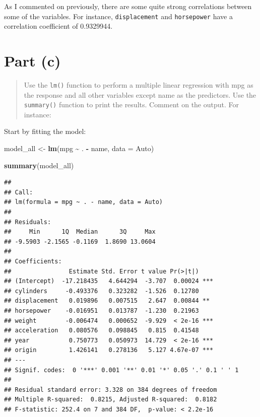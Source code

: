 \documentclass[
  11pt,
  a4paper]{article}
\newenvironment{Shaded}{\begin{snugshade}}{\end{snugshade}}
\newcommand{\AttributeTok}[1]{\textcolor[rgb]{0.13,0.29,0.53}{#1}}
\newcommand{\FunctionTok}[1]{\textcolor[rgb]{0.13,0.29,0.53}{\textbf{#1}}}
\newcommand{\NormalTok}[1]{#1}
\newcommand{\OtherTok}[1]{\textcolor[rgb]{0.56,0.35,0.01}{#1}}
\newcommand{\SpecialCharTok}[1]{\textcolor[rgb]{0.81,0.36,0.00}{\textbf{#1}}}
\begin{document}
As I commented on previously, there are some quite strong correlations between some of the variables. For instance, \texttt{displacement} and
\texttt{horsepower} have a correlation coefficient of 0.9329944.

\section{Part (c)}\label{part-c}

\begin{quote}
Use the \texttt{lm()} function to perform a multiple linear regression with mpg as the response and all other variables except name as the predictors. Use the \texttt{summary()} function to print the results. Comment on the output. For instance:
\end{quote}

Start by fitting the model:

\begin{Shaded}
\begin{Highlighting}[]
\NormalTok{model\_all }\OtherTok{\textless{}{-}} \FunctionTok{lm}\NormalTok{(mpg }\SpecialCharTok{\textasciitilde{}}\NormalTok{ . }\SpecialCharTok{{-}}\NormalTok{ name, }\AttributeTok{data =}\NormalTok{ Auto)}

\FunctionTok{summary}\NormalTok{(model\_all)}
\end{Highlighting}
\end{Shaded}

\begin{verbatim}
## 
## Call:
## lm(formula = mpg ~ . - name, data = Auto)
## 
## Residuals:
##     Min      1Q  Median      3Q     Max 
## -9.5903 -2.1565 -0.1169  1.8690 13.0604 
## 
## Coefficients:
##                Estimate Std. Error t value Pr(>|t|)    
## (Intercept)  -17.218435   4.644294  -3.707  0.00024 ***
## cylinders     -0.493376   0.323282  -1.526  0.12780    
## displacement   0.019896   0.007515   2.647  0.00844 ** 
## horsepower    -0.016951   0.013787  -1.230  0.21963    
## weight        -0.006474   0.000652  -9.929  < 2e-16 ***
## acceleration   0.080576   0.098845   0.815  0.41548    
## year           0.750773   0.050973  14.729  < 2e-16 ***
## origin         1.426141   0.278136   5.127 4.67e-07 ***
## ---
## Signif. codes:  0 '***' 0.001 '**' 0.01 '*' 0.05 '.' 0.1 ' ' 1
## 
## Residual standard error: 3.328 on 384 degrees of freedom
## Multiple R-squared:  0.8215, Adjusted R-squared:  0.8182 
## F-statistic: 252.4 on 7 and 384 DF,  p-value: < 2.2e-16
\end{verbatim}
\end{document}
